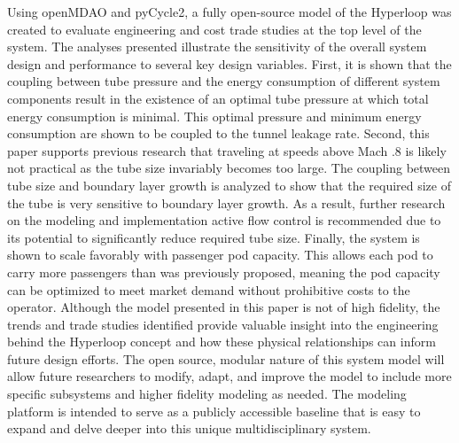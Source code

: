 Using openMDAO and pyCycle2, a fully open-source model of the Hyperloop was
created to evaluate engineering and cost trade studies at the top level of the system.
The analyses presented illustrate the sensitivity of the overall system design
and performance to several key design variables.
First, it is shown that the coupling between tube pressure and the energy
consumption of different system components result in the existence of an
optimal tube pressure at which total energy consumption is minimal.
This optimal pressure and minimum energy consumption are shown to be coupled to
the tunnel leakage rate.
Second, this paper supports previous research that traveling at speeds above
Mach .8 is likely not practical as the tube size invariably becomes too large.
The coupling between tube size and boundary layer growth is analyzed to show
that the required size of the tube is very sensitive to boundary layer growth.
As a result, further research on the modeling and implementation active flow
control is recommended due to its potential to significantly reduce required tube size.
Finally, the system is shown to scale favorably with passenger pod capacity.
This allows each pod to carry more passengers than was previously proposed,
meaning the pod capacity can be optimized to meet market demand without
prohibitive costs to the operator. Although the model presented in this paper
is not of high fidelity, the trends and trade studies identified provide
valuable insight into the engineering behind the Hyperloop concept and how
these physical relationships can inform future design efforts. The open source,
modular nature of this system model will allow future researchers to modify,
adapt, and improve the model to include more specific subsystems
and higher fidelity modeling as needed.
The modeling platform is intended to serve as a publicly accessible baseline
that is easy to expand and delve deeper into this unique multidisciplinary system.